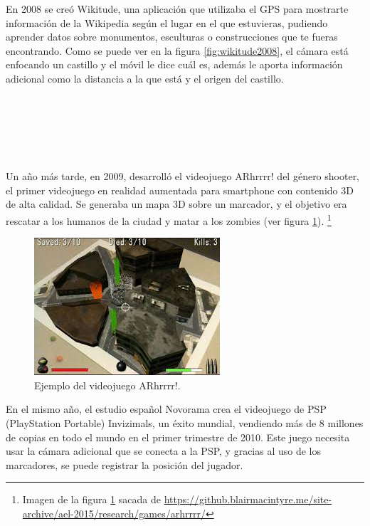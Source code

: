 En 2008 se creó Wikitude, una aplicación que utilizaba el GPS para mostrarte información de la Wikipedia según el lugar en el que estuvieras, pudiendo aprender datos sobre monumentos, esculturas o construcciones que te fueras encontrando. Como se puede ver en la figura \ref{fig:wikitude2008}, el cámara está enfocando un castillo y el móvil le dice cuál es, además le aporta información adicional como la distancia a la que está y el origen del castillo. \\
\\
\\
\\
\\
\\
\\

Un año más tarde, en 2009, desarrolló el videojuego ARhrrrr! del género shooter, el primer videojuego en realidad aumentada para smartphone con contenido 3D de alta calidad. Se generaba un mapa 3D sobre un marcador, y el objetivo era rescatar a los humanos de la ciudad y matar a los zombies (ver figura \ref{fig:arhrrrr})\cite{ARToolkit}.
{\let\thefootnote\relax\footnote{{Imagen de la figura \ref{fig:arhrrrr} sacada de \url{https://github.blairmacintyre.me/site-archive/ael-2015/research/games/arhrrrr/}}}}
\begin{figure}[H]
    \centering
        \includegraphics[width=0.5\linewidth]{Images/Arrrr.jpeg}
        \caption{Ejemplo del videojuego ARhrrrr!.}
        \label{fig:arhrrrr}
  \end{figure}
En el mismo año, el estudio español Novorama crea el videojuego de PSP (PlayStation Portable) Invizimals, un éxito mundial, vendiendo más de 8 millones de copias en todo el mundo en el primer trimestre de 2010. Este juego necesita usar la cámara adicional que se conecta a la PSP, y gracias al uso de los marcadores, se puede registrar la posición del jugador.


